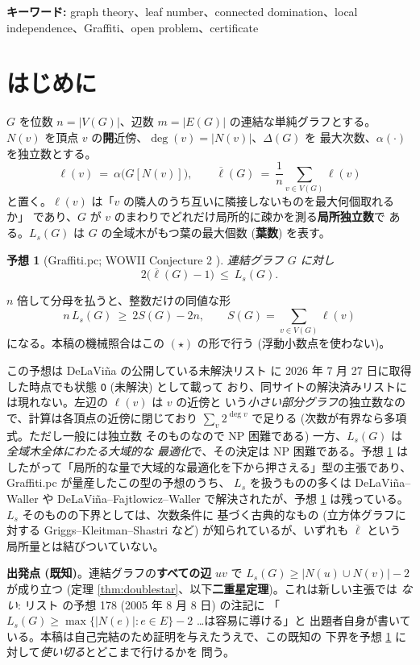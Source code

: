 \documentclass[paper=a4,fontsize=10.5pt,jafontsize=10.5pt]{jlreq}
\theoremstyle{plain}
\newtheorem{conjecture}[theorem]{予想}
\theoremstyle{definition}
\begin{document}
\noindent\textbf{キーワード:} graph theory、leaf number、connected domination、local independence、Graffiti、open problem、certificate


\section{はじめに}

$G$ を位数 $n = |V(G)|$、辺数 $m = |E(G)|$ の連結な単純グラフとする。
$N(v)$ を頂点 $v$ の\textbf{開}近傍、$\deg(v) = |N(v)|$、$\Delta(G)$ を
最大次数、$\alpha(\cdot)$ を独立数とする。
\[ \ell(v) \ = \ \alpha\bigl(G[N(v)]\bigr), \qquad
   \overline{\ell}(G) \ = \ \frac{1}{n} \sum_{v \in V(G)} \ell(v) \]
と置く。$\ell(v)$ は「$v$ の隣人のうち互いに隣接しないものを最大何個取れるか」
であり、$G$ が $v$ のまわりでどれだけ局所的に疎かを測る\textbf{局所独立数}で
ある。$L_s(G)$ は $G$ の全域木がもつ葉の最大個数 (\textbf{葉数}) を表す。

\begin{conjecture}[Graffiti.pc; WOWII Conjecture 2 \cite{wowii}]
\label{conj:wowii2}
連結グラフ $G$ に対し
\[ 2\bigl(\overline{\ell}(G) - 1\bigr) \ \le \ L_s(G) . \]
\end{conjecture}

$n$ 倍して分母を払うと、整数だけの同値な形
\[ n \, L_s(G) \ \ge \ 2 S(G) - 2n, \qquad
   S(G) = \sum_{v \in V(G)} \ell(v) \tag{$\star$} \]
になる。本稿の機械照合はこの $(\star)$ の形で行う (浮動小数点を使わない)。

この予想は DeLaViña の公開している未解決リスト \cite{wowii} に
2026 年 7 月 27 日に取得した時点でも状態 \texttt{O} (未解決) として載って
おり、同サイトの解決済みリストには現れない。左辺の $\ell(v)$ は $v$ の近傍と
いう\emph{小さい部分グラフ}の独立数なので、計算は各頂点の近傍に閉じており
$\sum_v 2^{\deg v}$ で足りる (次数が有界なら多項式。ただし一般には独立数
そのものなので NP 困難である) 一方、$L_s(G)$ は\emph{全域木全体にわたる大域的な
最適化}で、その決定は NP 困難である。予想 \ref{conj:wowii2} は
したがって「局所的な量で大域的な最適化を下から押さえる」型の主張であり、Graffiti.pc が量産したこの型の予想のうち、
$L_s$ を扱うものの多くは DeLaViña--Waller \cite{dw2008} や
DeLaViña--Fajtlowicz--Waller \cite{dfw2005} で解決されたが、予想
\ref{conj:wowii2} は残っている。$L_s$ そのものの下界としては、次数条件に
基づく古典的なもの (立方体グラフに対する Griggs--Kleitman--Shastri
\cite{griggs} など) が知られているが、いずれも $\overline{\ell}$ という
局所量とは結びついていない。

\medskip
\noindent\textbf{出発点 (既知)}。連結グラフの\textbf{すべての辺} $uv$ で
$L_s(G) \ge |N(u) \cup N(v)| - 2$ が成り立つ (定理
\ref{thm:doublestar}、以下\textbf{二重星定理})。これは新しい主張では
\emph{ない}: リスト \cite{wowii} の予想 178 (2005 年 8 月 8 日) の注記に
「$L_s(G) \ge \max\{|N(e)|: e \in E\} - 2$ …は容易に導ける」と
出題者自身が書いている。本稿は自己完結のため証明を与えたうえで、この既知の
下界を予想 \ref{conj:wowii2} に対して\emph{使い切る}とどこまで行けるかを
問う。
\end{document}
